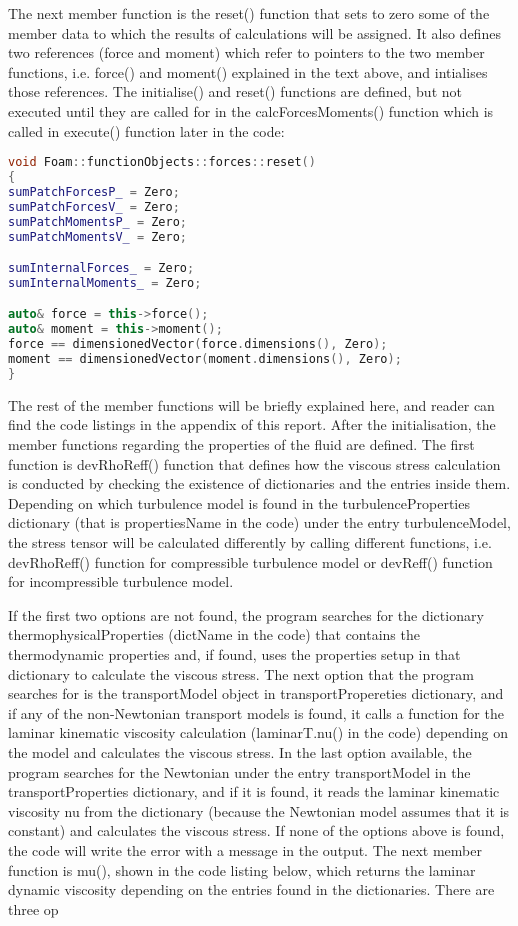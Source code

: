 The next member function is the reset() function that sets to zero some of the member data to which the results of calculations will be assigned. It also defines two references (force and moment) which refer to pointers to the two member functions, i.e. force() and moment() explained in the text above, and intialises those references. The initialise() and reset() functions are defined, but not executed until they are called for in the calcForcesMoments() function which is called in
execute() function later in the code:

\begin{lstlisting}[language=C++, caption=Member function \texttt{reset()} in \texttt{forces.C} file]
void Foam::functionObjects::forces::reset()
{
sumPatchForcesP_ = Zero;
sumPatchForcesV_ = Zero;
sumPatchMomentsP_ = Zero;
sumPatchMomentsV_ = Zero;

sumInternalForces_ = Zero;
sumInternalMoments_ = Zero;

auto& force = this->force();
auto& moment = this->moment();
force == dimensionedVector(force.dimensions(), Zero);
moment == dimensionedVector(moment.dimensions(), Zero);
}
\end{lstlisting}

The rest of the member functions will be briefly explained here, and reader can find the code listings in the appendix of this report. After the initialisation, the member functions regarding the properties of the fluid are defined. The first function is devRhoReff() function that defines how the viscous stress calculation is conducted by checking the existence of dictionaries and the entries inside
them. Depending on which turbulence model is found in the turbulenceProperties dictionary (that is propertiesName in the code) under the entry turbulenceModel, the stress tensor will be calculated differently by calling different functions, i.e. devRhoReff() function for compressible turbulence model or devReff() function for incompressible turbulence model.

If the first two options are not found, the program searches for the dictionary thermophysicalProperties (dictName in the code) that contains the thermodynamic properties and, if found, uses the properties setup in that dictionary to calculate the viscous stress. The next option that the program searches for is the transportModel object in transportPropereties dictionary, and if any of the non-Newtonian transport models is found, it calls a function for the laminar kinematic viscosity calculation (laminarT.nu() in the code) depending on the model and calculates the viscous stress. In the last option available, the program searches for the Newtonian under the entry transportModel in the transportProperties dictionary, and if it is found, it reads the laminar kinematic viscosity nu from the dictionary (because the Newtonian model assumes that it is constant) and calculates the viscous stress. If none of the options above is found, the code will write the error with a message in the output. The next member function is mu(), shown in the code listing below, which returns the laminar dynamic viscosity depending on the entries found in the dictionaries. There are three op

